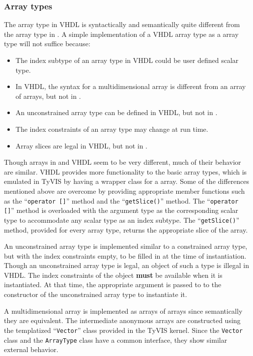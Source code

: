 \documentclass[11pt]{article}
\begin{document}
\subsubsection{Array types}

The array type in VHDL is syntactically and semantically quite different
from the array type in \Cpp\/.  A simple implementation of a VHDL array type
as a \Cpp\/ array type will not suffice because:

\begin{itemize}
\item The index subtype of an array type in VHDL could be user defined
  scalar type.
\item In VHDL, the syntax for a multidimensional array is different from
  an array of arrays, but not in \Cpp\/.
\item An unconstrained array type can be defined in VHDL, but not in \Cpp\/.
\item The index constraints of an array type may change at run time.
\item Array slices are legal in VHDL, but not in \Cpp\/.
\end{itemize}

Though arrays in \Cpp\/ and VHDL seem to be very different, much of
their behavior are similar.  VHDL provides more functionality to the
basic array types, which is emulated in TyVIS by having a wrapper
class for a \Cpp\/ array.  Some of the differences mentioned above are
overcome by providing appropriate member functions such as the
``\texttt{operator []}'' method and the ``\texttt{getSlice()}''
method.  The ``\texttt{operator []}'' method is overloaded with the
argument type as the corresponding scalar type to accommodate any
scalar type as an index subtype.  The ``\texttt{getSlice()}'' method,
provided for every array type, returns the appropriate slice of the
array.

An unconstrained array type is implemented similar to a constrained
array type, but with the index constraints empty, to be filled in at
the time of instantiation.  Though an unconstrained array type is
legal, an object of such a type is illegal in VHDL.  The index
constraints of the object \textbf{must} be available when it is
instantiated.  At that time, the appropriate argument is passed to to
the constructor of the unconstrained array type to instantiate it.

A multidimensional array is implemented as arrays of arrays since
semantically they are equivalent.  The intermediate anonymous arrays
are constructed using the templatized ``\texttt{Vector}'' class
provided in the TyVIS kernel.  Since the \texttt{Vector} class and the
\texttt{ArrayType} class have a common interface, they show similar
external behavior.
\end{document}
